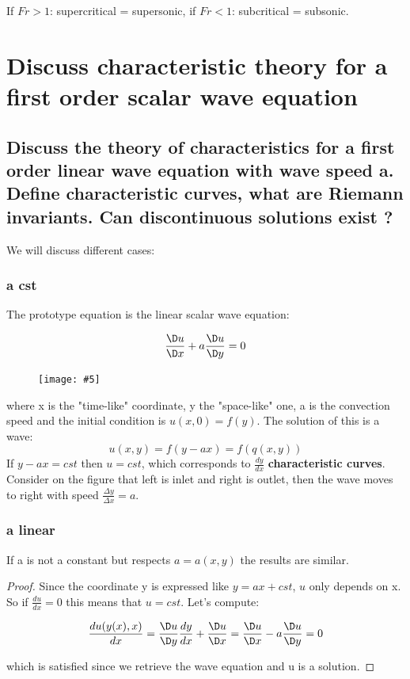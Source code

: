 \documentclass[british,french,11pt, a4paper, openany]{article}
\newcommand{\wrapfig}[6]{%
	\begin{figure}%
		\vspace{-5mm}%
		\texttt{[image: \#5]}%
		\captionof{figure}{}%
		\label{#6}%
	\end{figure}%
}
\begin{document}
If $Fr > 1$: supercritical = supersonic, if $Fr < 1$: subcritical = subsonic. 



\section{Discuss characteristic theory for a first order scalar wave equation}
\subsection{Discuss the theory of characteristics for a first order linear wave equation with wave speed a. Define characteristic curves, what are Riemann invariants. Can discontinuous solutions exist ?}
We will discuss different cases:

\subsubsection{a cst}	
The prototype equation is the linear scalar wave equation: 

\begin{equation}
\frac{\D u}{\D x} + a \frac{\D u}{\D y} = 0
\end{equation}

\wrapfig{9}{l}{6}{0.2}{ch8/9}{ch8/9}
where x is the "time-like" coordinate, y the "space-like" one, a is the convection speed and the initial condition is $u(x,0) = f(y)$. The solution of this is a wave: 
\begin{equation}
u(x,y) = f(y-ax) = f(q(x,y))
\end{equation}
If $y-ax = cst$ then $u= cst$, which corresponds to $\frac{dy}{dx}$ \textbf{characteristic curves}. Consider on the figure that left is inlet and right is outlet, then the wave moves to right with speed $\frac{\Delta y}{\Delta x} = a$. 

\subsubsection{a linear}
If a is not a constant but respects $a = a(x,y)$ the results are similar. 

\begin{proof}
	Since the coordinate y is expressed like $y = ax + cst$, $u$ only depends on x. So if $\frac{du}{dx} = 0$ this means that $u = cst$. Let's compute: 
	
	\begin{equation}
	\frac{du(y(x),x)}{dx} = \frac{\D u}{\D y} \frac{d y}{dx} + \frac{\D u}{\D x} = \frac{\D u}{\D x} -a \frac{\D u}{\D y} = 0
	\end{equation}
	
	which is satisfied since we retrieve the wave equation and u is a solution. 
\end{proof}
\end{document}
